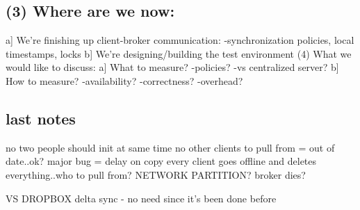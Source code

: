 \subsection{(3) Where are we now:}
                                                  a] We're finishing up client-broker communication:
                                                        -synchronization policies, local timestamps, locks
                                                          b] We're designing/building the test environment
                                                          (4) What we would like to discuss:
                                                            a] What to measure?
                                                                  -policies?
                                                                        -vs centralized server?
                                                                          b] How to measure?
                                                                                -availability?
                                                                                      -correctness?
                                                                                            -overhead?
\subsection{last notes}
no two people should init at same time
no other clients to pull from = out of date..ok?
major bug = delay on copy
every client goes offline and deletes everything..who to pull from?
NETWORK PARTITION?
broker dies?

VS DROPBOX
delta sync - no need since it's been done before
